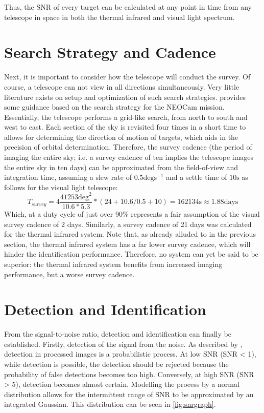Thus, the SNR of every target can be calculated at any point in time from any telescope in space in both the thermal infrared and visual light spectrum.

\section{Search Strategy and Cadence}
\label{sec:modelling_cadence}
Next, it is important to consider how the telescope will conduct the survey. Of course, a telescope can not view in all directions simultaneously. Very little literature exists on setup and optimization of such search strategies. \cite{Cadence} provides some guidance based on the search strategy for the NEOCam mission. Essentially, the telescope performs a grid-like search, from north to south and west to east. Each section of the sky is revisited four times in a short time to allows for determining the direction of motion of targets, which aids in the precision of orbital determination. Therefore, the survey cadence (the period of imaging the entire sky; i.e. a survey cadence of ten implies the telescope images the entire sky in ten days) can be approximated from the field-of-view and integration time, assuming a slew rate of $0.5 \mathrm{deg}\mathrm{s}^{-1}$ and a settle time of $10 \mathrm{s}$ as follows for the visual light telescope:
\begin{equation}
 T_{survey} = 4\frac{41253 \mathrm{deg}^2}{10.6 * 5.3} * (24 + 10.6/0.5 + 10) = 162134 \mathrm{s} \approx 1.88 \mathrm{days}
\end{equation}
Which, at a duty cycle of just over 90\% represents a fair assumption of the visual survey cadence of 2 days. Similarly, a survey cadence of 21 days was calculated for the thermal infrared system. Note that, as already alluded to in the previous section, the thermal infrared system has a far lower survey cadence, which will hinder the identification performance. Therefore, no system can yet be said to be superior: the thermal infrared system benefits from increased imaging performance, but a worse survey cadence.

\section{Detection and Identification}
\label{sec:modelling_identification}

From the signal-to-noise ratio, detection and identification can finally be established. Firstly, detection of the signal from the noise. As described by \cite{2017NEOSDT}, detection in processed images is a probabilistic process. At low SNR (SNR < 1), while detection is possible, the detection should be rejected because the probability of false detections becomes too high. Conversely, at high SNR (SNR > 5), detection becomes almost certain. Modelling the process by a normal distribution allows for the intermittent range of SNR to be approximated by an integrated Gaussian. This distribution can be seen in \autoref{fig:snrgraph}. \\

